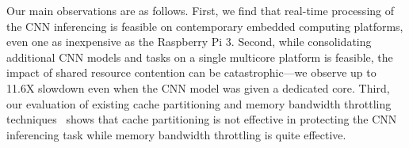 %
%
%
%
%
%
Our main observations are as follows.
First, we find that real-time processing of the CNN inferencing is
feasible on contemporary embedded computing platforms, even one   
as inexpensive as the Raspberry Pi 3. Second, while consolidating
additional CNN models and tasks on a single multicore platform is
feasible, the impact of shared resource contention can be
catastrophic---we observe up to 11.6X slowdown even when the CNN model
was given a dedicated core.
Third, our evaluation of existing cache
partitioning and memory bandwidth throttling
techniques~\cite{yun2014rtas,Yun2013} shows that cache partitioning is
not effective in protecting the CNN inferencing task while memory
bandwidth throttling is quite effective.


